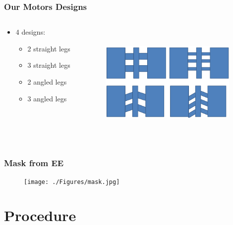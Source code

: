 \documentclass[11pt]{beamer}
\theoremstyle{definition}
\begin{document}
   \begin{frame} \frametitle{Our Motors Designs}
      \begin{columns}

      \begin{column}{0.35 \textwidth}
      \begin{itemize}
        \item 4 designs:
        \begin{itemize}
          \item 2 straight legs
          \item 3 straight legs
          \item 2 angled legs
          \item 3 angled legs
        \end{itemize}
      \end{itemize}
    \end{column}

    \begin{column}{0.62\textwidth}
    \begin{figure}[ht]
          \centering
          \includegraphics[width=2.6in, height=2.3in]{./Figures/EngineDesigns.png}
          \label{fig:sharpie}
      \end{figure}
    \end{column}
    \end{columns}
    \end{frame}

    \begin{frame}\frametitle{Mask from EE}
        \begin{figure}[ht]
          \centering
          \texttt{[image: ./Figures/mask.jpg]}
          \label{fig:mask}
      \end{figure}
    \end{frame}

\section{Procedure} \label{sec:procedure}
\end{document}
